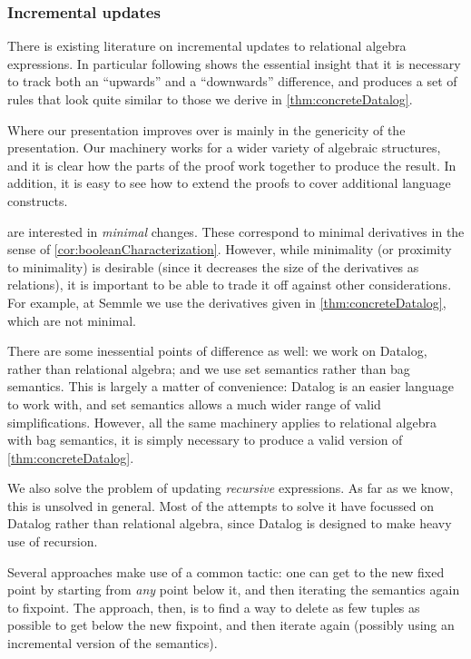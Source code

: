 \subsubsection{Incremental updates}

There is existing literature on incremental updates to relational algebra
expressions. In particular \textcite{griffin1997improved} following
\textcite{qian1991incremental} shows the essential insight that it is necessary to
track both an ``upwards'' and a ``downwards'' difference, and produces a set of
rules that look quite similar to those we derive in \cref{thm:concreteDatalog}.

Where our presentation improves over \citeauthor{griffin1997improved} is mainly in
the genericity of the presentation. Our machinery works for a wider variety of
algebraic structures, and it is clear how the parts of the proof work together
to produce the result. In addition, it is easy to see how to extend the proofs
to cover additional language constructs.

\citeauthor{griffin1997improved} are interested in \emph{minimal} changes. These correspond to
minimal derivatives in the sense of \cref{cor:booleanCharacterization}. However,
while minimality (or proximity to minimality) is desirable (since it decreases
the size of the derivatives as relations), it is important to be able to trade
it off against other considerations. For example, at
Semmle we use the derivatives given in \cref{thm:concreteDatalog}, which are not minimal.

There are some inessential points of difference as well: we work on Datalog,
rather than relational algebra; and we use set semantics rather than bag
semantics. This is largely a matter of convenience: Datalog is an easier
language to work with, and set semantics allows a much wider range of valid
simplifications. However, all the same machinery applies to relational algebra
with bag semantics, it is simply necessary to produce a valid version of \cref{thm:concreteDatalog}.

We also solve the problem of updating \emph{recursive} expressions. As far as we
know, this is unsolved in general. Most of the attempts to solve it have
focussed on Datalog rather than relational algebra, since Datalog is designed to
make heavy use of recursion. 

Several approaches
\autocites{gupta1993maintaining}{harrison1992maintenance}
make use of a common tactic: one can get to the new fixed
point by starting from \emph{any} point below it, and then iterating the
semantics again to fixpoint. The approach, then, is to find a way to delete as
few tuples as possible to get below the new fixpoint, and then iterate again
(possibly using an incremental version of the semantics).

